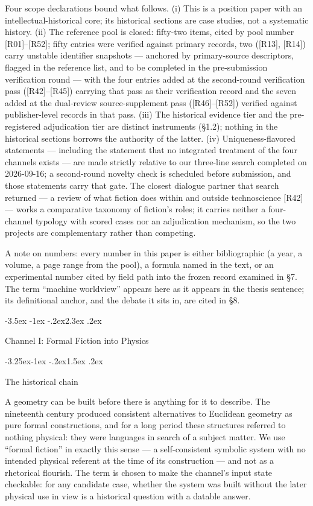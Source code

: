\documentclass[11pt,a4paper]{article}
\makeatletter
\renewcommand\section{\@startsection{section}{1}{\z@}%
  {-3.5ex \@plus -1ex \@minus -.2ex}{2.3ex \@plus .2ex}%
  {\normalfont\Large\bfseries\raggedright}}
\renewcommand\subsection{\@startsection{subsection}{2}{\z@}%
  {-3.25ex\@plus -1ex \@minus -.2ex}{1.5ex \@plus .2ex}%
  {\normalfont\large\bfseries\raggedright}}
\makeatother
\begin{document}
Four scope declarations bound what follows. (i) This is a position paper with an intellectual-historical core; its historical sections are case studies, not a systematic history. (ii) The reference pool is closed: fifty-two items, cited by pool number [R01]–[R52]; fifty entries were verified against primary records, two ([R13], [R14]) carry unstable identifier snapshots — anchored by primary-source descriptors, flagged in the reference list, and to be completed in the pre-submission verification round — with the four entries added at the second-round verification pass ([R42]–[R45]) carrying that pass as their verification record and the seven added at the dual-review source-supplement pass ([R46]–[R52]) verified against publisher-level records in that pass. (iii) The historical evidence tier and the pre-registered adjudication tier are distinct instruments (§1.2); nothing in the historical sections borrows the authority of the latter. (iv) Uniqueness-flavored statements — including the statement that no integrated treatment of the four channels exists — are made strictly relative to our three-line search completed on 2026-09-16; a second-round novelty check is scheduled before submission, and those statements carry that gate. The closest dialogue partner that search returned — a review of what fiction does within and outside technoscience [R42] — works a comparative taxonomy of fiction's roles; it carries neither a four-channel typology with scored cases nor an adjudication mechanism, so the two projects are complementary rather than competing.

A note on numbers: every number in this paper is either bibliographic (a year, a volume, a page range from the pool), a formula named in the text, or an experimental number cited by field path into the frozen record examined in §7. The term ``machine worldview'' appears here as it appears in the thesis sentence; its definitional anchor, and the debate it sits in, are cited in §8.

\section{Channel I: Formal Fiction into Physics}

\subsection{The historical chain}

A geometry can be built before there is anything for it to describe. The nineteenth century produced consistent alternatives to Euclidean geometry as pure formal constructions, and for a long period these structures referred to nothing physical: they were languages in search of a subject matter. We use ``formal fiction'' in exactly this sense — a self-consistent symbolic system with no intended physical referent at the time of its construction — and not as a rhetorical flourish. The term is chosen to make the channel's input state checkable: for any candidate case, whether the system was built without the later physical use in view is a historical question with a datable answer.
\end{document}
